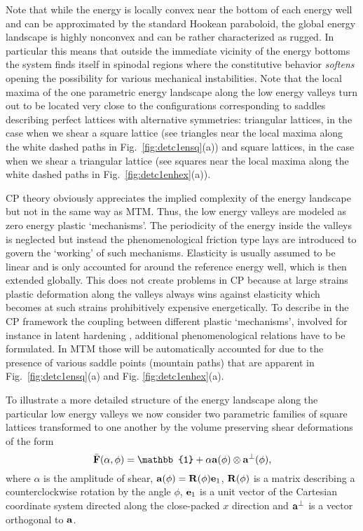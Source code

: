 \documentclass[CRPHYS,Unicode,manuscript]{cedram}
\begin{document}
Note that while the energy is locally convex   near the bottom of each  energy well and can be approximated by the standard Hookean paraboloid, the global energy landscape is highly nonconvex and can be rather characterized  as rugged. In particular this means that outside the immediate vicinity of the energy bottoms the system finds itself in spinodal regions where the constitutive behavior \emph{softens} opening the possibility for  various mechanical  instabilities. Note that the local maxima of the one parametric energy landscape along the low energy valleys turn out to be located  very close to the configurations corresponding to saddles describing perfect  lattices with alternative  symmetries: triangular lattices, in the case  when we shear a square lattice (see triangles  near the local maxima along the white dashed paths in Fig.~\ref{fig:detc1ensq}(a)) and square lattices, in the case  when we shear a triangular lattice (see squares near the local maxima along the white dashed paths in Fig.~\ref{fig:detc1enhex}(a)).

CP theory obviously appreciates  the  implied complexity of the energy landscape but not in the same way as MTM. Thus, the  low energy valleys are modeled as  zero energy plastic `mechanisms'. The periodicity of the energy inside the valleys is neglected but instead the phenomenological friction type lays are introduced to govern the `working' of such mechanisms.  Elasticity is usually assumed to be linear and is only accounted for around the reference energy well,  which is then extended globally. This does not create  problems in CP because at large strains plastic deformation along the valleys always wins against  elasticity which becomes at such strains prohibitively expensive energetically. To describe in the CP framework the coupling between different plastic `mechanisms', involved for instance in latent hardening \cite{Ortiz1999-pp}, additional phenomenological relations have to be formulated. In MTM those will be automatically accounted for due to the presence of various saddle points  (mountain paths) that are apparent in    Fig.~\ref{fig:detc1ensq}(a) and Fig. \ref{fig:detc1enhex}(a).
 
To illustrate  a  more detailed structure of the energy landscape along the particular low energy valleys  we now consider  two parametric families of square lattices  transformed to one another  by  the volume preserving shear deformations of the form
\begin{equation}
\label{paths_sq}
\bar{\bf F}(\alpha,\phi) =\mathbb{1} +\alpha{\bf a} (\phi)\otimes{\bf a} ^\perp(\phi),
\end{equation}
where $\alpha$ is the amplitude of shear, ${\bf a}(\phi) ={\bf R(\phi)}{\bf e}_1$, ${\bf R}(\phi)$  is a matrix describing  a   counterclockwise rotation by the  angle $\phi$, ${\bf e}_1$ is a unit vector of the Cartesian coordinate system  directed along the  close-packed  $x$ direction and ${\bf a} ^\perp$ is a  vector orthogonal to  ${\bf a} $. 
\end{document}
